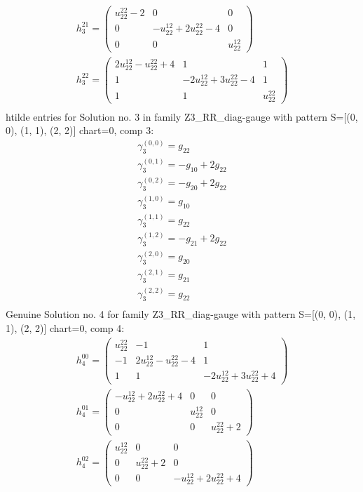 \documentclass[a4paper, 11pt, twoside, onecolumn]{article}
\begin{document}
\begin{landscape}
\begin{gather*}
	 h_3^{21}=\begin{pmatrix}u^{22}_{22} - 2 & 0 & 0\\0 & - u^{12}_{22} + 2 u^{22}_{22} - 4 & 0\\0 & 0 & u^{12}_{22}\end{pmatrix}\\ 
	 h_3^{22}=\begin{pmatrix}2 u^{12}_{22} - u^{22}_{22} + 4 & 1 & 1\\1 & - 2 u^{12}_{22} + 3 u^{22}_{22} - 4 & 1\\1 & 1 & u^{22}_{22}\end{pmatrix}\\ 
\end{gather*} 
htilde entries for Solution no. 3 in family Z3_RR_diag-gauge with pattern S=[(0, 0), (1, 1), (2, 2)] chart=0, comp 3: 
\begin{gather*} 
	 \gamma^{(0, 0)}_3=g_{22}\\ 
	 \gamma^{(0, 1)}_3=- g_{10} + 2 g_{22}\\ 
	 \gamma^{(0, 2)}_3=- g_{20} + 2 g_{22}\\ 
	 \gamma^{(1, 0)}_3=g_{10}\\ 
	 \gamma^{(1, 1)}_3=g_{22}\\ 
	 \gamma^{(1, 2)}_3=- g_{21} + 2 g_{22}\\ 
	 \gamma^{(2, 0)}_3=g_{20}\\ 
	 \gamma^{(2, 1)}_3=g_{21}\\ 
	 \gamma^{(2, 2)}_3=g_{22}\\ 
\end{gather*} 
Genuine Solution no. 4 for family Z3_RR_diag-gauge with pattern S=[(0, 0), (1, 1), (2, 2)] chart=0, comp 4: 
\begin{gather*} 
	 h_4^{00}=\begin{pmatrix}u^{22}_{22} & -1 & 1\\-1 & 2 u^{12}_{22} - u^{22}_{22} - 4 & 1\\1 & 1 & - 2 u^{12}_{22} + 3 u^{22}_{22} + 4\end{pmatrix}\\ 
	 h_4^{01}=\begin{pmatrix}- u^{12}_{22} + 2 u^{22}_{22} + 4 & 0 & 0\\0 & u^{12}_{22} & 0\\0 & 0 & u^{22}_{22} + 2\end{pmatrix}\\ 
	 h_4^{02}=\begin{pmatrix}u^{12}_{22} & 0 & 0\\0 & u^{22}_{22} + 2 & 0\\0 & 0 & - u^{12}_{22} + 2 u^{22}_{22} + 4\end{pmatrix}\\ 

\end{gather*}
\end{landscape}
\end{document}
